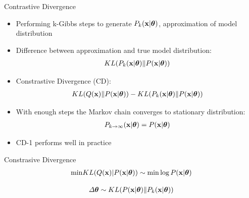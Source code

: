 	\begin{frame}[t]{Contrastive Divergence}
	 \begin{itemize}
	    \item Performing k-Gibbs steps to generate $P_k(\mathbf{x}|\boldsymbol{\theta})$, approximation of model distribution
	    
	    \item Difference between approximation and true model distribution:
		\begin{align}
		    KL(P_{k}(\mathbf{x}|\boldsymbol{\theta})\|P(\mathbf{x}|\boldsymbol{\theta}))\nonumber
		\end{align}
	    \item Constrastive Divergence (CD):
	    \begin{align}
	    KL(Q(\mathbf{x})\|P(\mathbf{x}|\boldsymbol{\theta}))- KL(P_{k}(\mathbf{x}|\boldsymbol{\theta})\|P(\mathbf{x}|\boldsymbol{\theta}))\nonumber
	    \end{align}
	    
	    \item With enough steps the Markov chain converges to stationary distribution:
		  \begin{align}
		      P_{k\rightarrow \infty}(\mathbf{x}|\boldsymbol{\theta})=P(\mathbf{x}|\boldsymbol{\theta})\nonumber
		  \end{align}
	    \item CD-1 performs well in practice
	 \end{itemize}
	  
	 
	\end{frame}
	
	\begin{frame}[t]{Constrasive Divergence}
	 \begin{align}
	  \mathrm{min} KL(Q(\x)|P(\x|\btheta)) \sim \mathrm{min} \log P(\x|\btheta)\nonumber\\
	  
	 \end{align}

	 \begin{align}
	  \Delta \boldsymbol{\theta} \sim KL(P(\mathbf{x}|\boldsymbol{\theta})\|P_{k}(\mathbf{x}|\boldsymbol{\theta}))\nonumber
	 \end{align}

	\end{frame}





